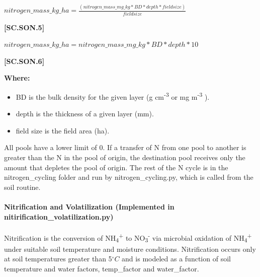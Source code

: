     \begin{center}
 \(nitrogen\_mass\_kg\_ha=\frac{(nitrogen\_mass\_mg\_kg * BD * depth * field size)}{field size}\)
    \end{center}
        \vspace{0.5cm} 
    
            {\raggedleft \textbf{[SC.SON.5]}\par}
            \vspace{0.5cm}

     \begin{center}
 \(nitrogen\_mass\_kg\_ha= nitrogen\_mass\_mg\_kg * BD * depth * 10\)
    \end{center}
        \vspace{0.5cm} 
    
            {\raggedleft \textbf{[SC.SON.6]}\par}
            \vspace{0.5cm}

        \textbf{Where:}
            
        \begin{itemize}
            \item BD is the bulk density for the given layer (g cm\textsuperscript{-3} or mg m\textsuperscript{-3} ).
            \item depth is the thickness of a given layer (mm).
            \item field size is the field area (ha).
        \end{itemize}
    \vspace{0.5cm}

All pools have a lower limit of 0. If a transfer of N from one pool to another is greater than the N in the pool of origin, the destination pool receives only the amount that depletes the pool of origin. The rest of the N cycle is in the nitrogen\_cycling folder and run by nitrogen\_cycling.py, which is called from the soil routine.

\paragraph{Nitrification and Volatilization (Implemented in nitirification\_volatilization.py)}

Nitrification is the conversion of  NH\textsubscript{4}\textsuperscript{+} to NO\textsubscript{3}\textsuperscript{-} via microbial oxidation of NH\textsubscript{4}\textsuperscript{+} under suitable soil temperature and moisture conditions. Nitrification occurs only at soil temperatures greater than 5\(^\circ C\) and is modeled as a function of soil temperature and water factors, temp\_factor and water\_factor.
\vspace{0.5cm}
            
